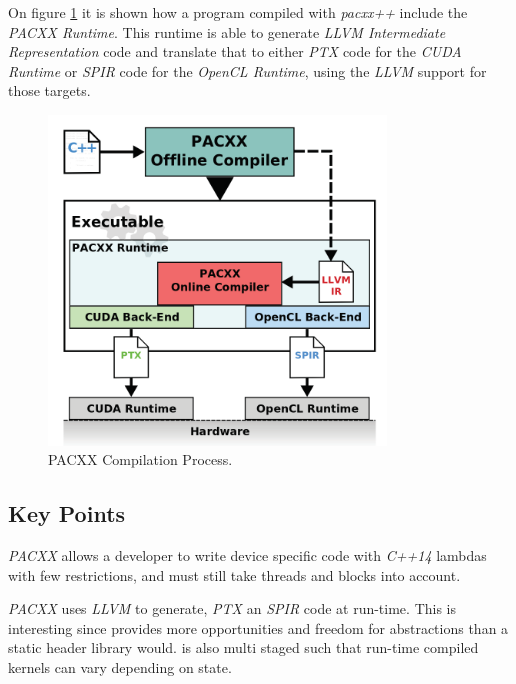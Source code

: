 On figure \ref{fig:pacxxCompilation} it is shown how a program compiled with \textit{pacxx++} include the \textit{PACXX Runtime}. This runtime is able to generate \textit{LLVM Intermediate Representation} code and translate that to either \textit{PTX} code for the \textit{CUDA Runtime} or \textit{SPIR} code for the \textit{OpenCL Runtime}, using the \textit{LLVM} support for those targets.
\begin{figure}[H]
\center
\includegraphics[width=0.8\textwidth]{chapters/relatedWorks/figures/pacxx_compilation_cool.png}
\caption{PACXX Compilation Process\cite{pacxxPaper2}.}
\label{fig:pacxxCompilation}
\end{figure}

\subsection{Key Points}
\textit{PACXX} allows a developer to write device specific code with \textit{C++14} lambdas with few restrictions, and must still take threads and blocks into account. 

\textit{PACXX} uses \textit{LLVM} to generate, \textit{PTX} an \textit{SPIR} code at run-time. This is interesting since provides more opportunities and freedom for abstractions than a static header library would.  is also multi staged such that run-time compiled kernels can vary depending on state.
